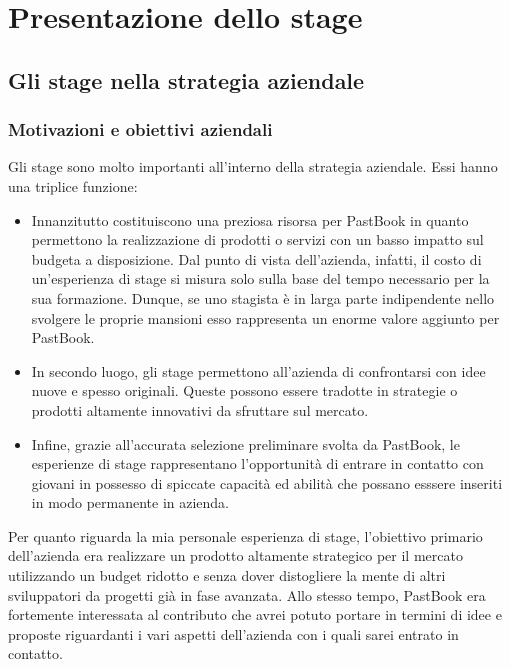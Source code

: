 \chapter{Presentazione dello stage}
	\section{Gli stage nella strategia aziendale}
		\subsection{Motivazioni e obiettivi aziendali}
			Gli stage sono molto importanti all'interno della strategia aziendale. Essi hanno una triplice funzione:
			\begin{itemize}
				\item Innanzitutto costituiscono una preziosa risorsa per PastBook in quanto permettono la realizzazione di prodotti
				o servizi con un basso impatto sul budgeta a disposizione. Dal punto di vista dell'azienda, infatti, il costo di
				un'esperienza di stage si misura solo sulla base del tempo necessario per la sua formazione. Dunque, se uno stagista
				è in larga parte indipendente nello svolgere le proprie mansioni esso rappresenta un enorme valore aggiunto per
				PastBook.
				\item In secondo luogo, gli stage permettono all'azienda di confrontarsi con idee nuove e spesso originali. Queste
				possono essere tradotte in strategie o prodotti altamente innovativi da sfruttare sul mercato.
				\item Infine, grazie all'accurata selezione preliminare svolta da PastBook, le esperienze di stage rappresentano
				l'opportunità di entrare in contatto con giovani in possesso di spiccate capacità ed abilità che possano esssere
				inseriti in modo permanente in azienda.
			\end{itemize}
			Per quanto riguarda la mia personale esperienza di stage, l'obiettivo primario dell'azienda era realizzare un
			prodotto altamente strategico per il mercato utilizzando un budget ridotto e senza dover distogliere la mente di altri
			sviluppatori da progetti già in fase avanzata. Allo stesso tempo, PastBook era fortemente interessata al contributo che avrei
			potuto portare in termini di idee e proposte riguardanti i vari aspetti dell'azienda con i quali sarei entrato in contatto.
